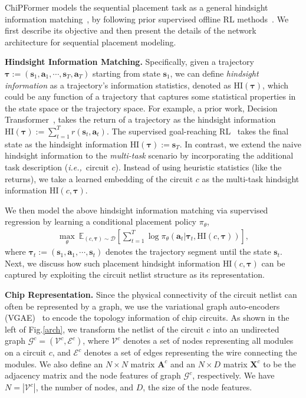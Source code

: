 \documentclass{article}
\newcommand{\ie}{\textit{i.e.,}~}
\newcommand{\bs}{\bm{s}}
\newcommand{\ba}{\bm{a}}
\newcommand{\bc}{{c}}
\newcommand{\btau}{\bm{\tau}}
\theoremstyle{plain}
\theoremstyle{definition}
\theoremstyle{remark}
\begin{document}
ChiPFormer models the sequential placement task as a general {hindsight information matching}~\citep{furuta2021generalized}, by following prior supervised offline RL methods~\citep{chen2021decision, emmons2021rvs}.
We first describe its objective and then present the details of the network architecture for sequential placement modeling.


\textbf{Hindsight Information Matching.} 
Specifically, given a trajectory $\bm{\tau}:=(\bs_1, \ba_1, \cdots, \bs_{T}, \ba_{T})$ starting from state $\bs_1$, we can define \textit{hindsight information} as a trajectory's information statistics, denoted as $\text{HI}(\btau)$, which could be any function of a trajectory that captures some statistical properties in the state space or the trajectory space. For example, a prior work, Decision Transformer~\citep{chen2021decision}, takes the return of a trajectory as the {hindsight information} $\text{HI}(\bm{\tau}) := \sum_{t=1}^{T}r(\bm{s}_t, \bm{a}_t)$. The supervised goal-reaching RL~\citep{ghosh2019learning} takes the final state as the hindsight information $\text{HI}(\btau) := \bs_{T}$. 
In contrast, we extend the naive {hindsight information} to the \textit{multi-task} scenario by incorporating the additional task description  (\ie circuit $c$). Instead of using heuristic statistics (like the returns), we take a learned embedding of the circuit $\bc$ as the multi-task {hindsight information} $\text{HI}(\bc, \btau)$. 

We then model the above hindsight information matching  via supervised regression by learning a conditional placement policy $\pi_\theta$, 
\begin{align}
\max_{\theta} \ \mathbb{E}_{(c,\btau)\sim \mathcal{D}}\left[\sum_{t=1}^{T} \log \pi_\theta(\ba_{t}|\btau_{t}, \text{HI}(c,\btau)) \right],\label{eq:hindsight-information-matching}
\end{align}
where $\btau_{t}:= (\bs_1, \ba_1, \cdots, \bs_t)$ denotes the trajectory segment  until the state $\bs_t$. 
Next, we discuss how such placement {hindsight information} $\text{HI}(c, \btau)$ can be captured by exploiting the circuit netlist structure as its representation. 



\textbf{Chip Representation.} Since the physical connectivity of the circuit netlist can often be represented by a graph, we use the variational graph auto-encoders (VGAE)~\citep{kipf2016variational} 
to encode the topology information of chip circuits.  
As shown in the left of Fig.\ref{arch}, 
we transform the netlist of the circuit $\bc$ into an undirected graph $\mathcal{G}^\bc = (\mathcal{V}^\bc,\mathcal{E}^\bc)$, where $\mathcal{V}^\bc$ denotes a set of nodes representing all modules on a circuit $\bc$, and $\mathcal{E}^\bc$ denotes a set of edges representing the wire connecting the modules. 
We also define an $N\times N$ matrix $\textbf{A}^\bc$ and an $N\times D$ matrix $\textbf{X}^\bc$ to be the adjacency matrix and the node features of graph $\mathcal{G}^\bc$, respectively.
We have $N = |\mathcal{V}^c|$, the number of nodes, and $D$, the size of the node features. 
\end{document}
